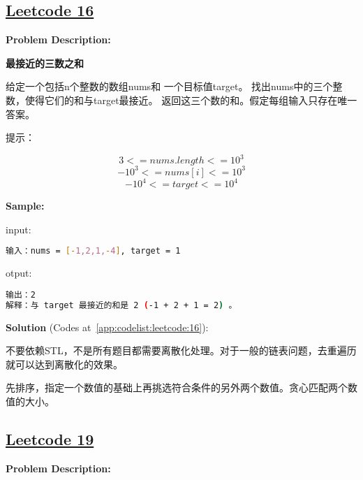\subsection{\href{https://leetcode-cn.com/}{Leetcode 16}}\label{app:problemlist:leetcode:16}

\textbf{Problem Description:}\par

\textbf{最接近的三数之和}\par

给定一个包括n个整数的数组nums和 一个目标值target。
找出nums中的三个整数，使得它们的和与target最接近。
返回这三个数的和。假定每组输入只存在唯一答案。\par

提示：\par

$$ 3 <= nums.length <= 10^{3} $$
$$ -10^{3} <= nums[i] <= 10^{3} $$
$$ -10^{4} <= target <= 10^{4} $$


\textbf{Sample:}\par

input:\par

\begin{lstlisting}[language=bash]
输入：nums = [-1,2,1,-4], target = 1
\end{lstlisting}

otput:\par

\begin{lstlisting}[language=bash]
输出：2
解释：与 target 最接近的和是 2 (-1 + 2 + 1 = 2) 。
\end{lstlisting}

\textbf{Solution }(Codes at~\ref{app:codelist:leetcode:16}):\par

不要依赖STL，不是所有题目都需要离散化处理。对于一般的链表问题，去重遍历就可以达到离散化的效果。\par

先排序，指定一个数值的基础上再挑选符合条件的另外两个数值。贪心匹配两个数值的大小。\par



\subsection{\href{https://leetcode-cn.com/}{Leetcode 19}}\label{app:problemlist:leetcode:19}

\textbf{Problem Description:}\par

